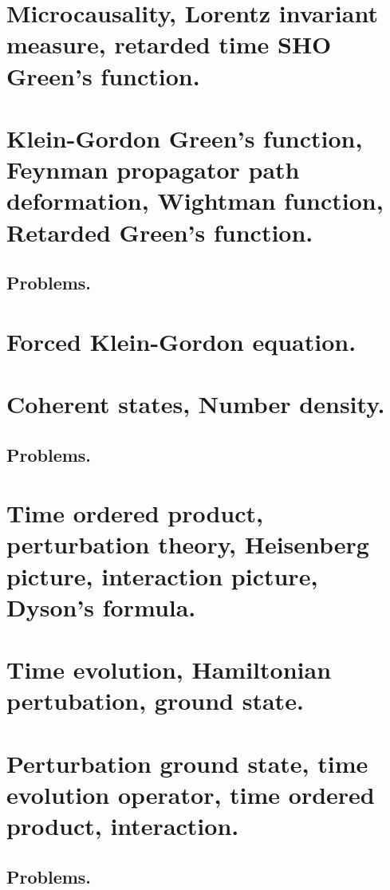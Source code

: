    \chapter{Microcausality, Lorentz invariant measure, retarded time SHO Green's function.}
      
   \chapter{Klein-Gordon Green's function, Feynman propagator path deformation, Wightman function, Retarded Green's function.}
      
      \section{Problems.}
         
   \chapter{Forced Klein-Gordon equation.}
      
   \chapter{Coherent states, Number density.}
      
      \section{Problems.}
         
   \chapter{Time ordered product, perturbation theory, Heisenberg picture, interaction picture, Dyson's formula.}
      
      
   \chapter{Time evolution, Hamiltonian pertubation, ground state.}
      
   \chapter{Perturbation ground state, time evolution operator, time ordered product, interaction.}
      
      
      \section{Problems.}
         
         
         
         
         
         
